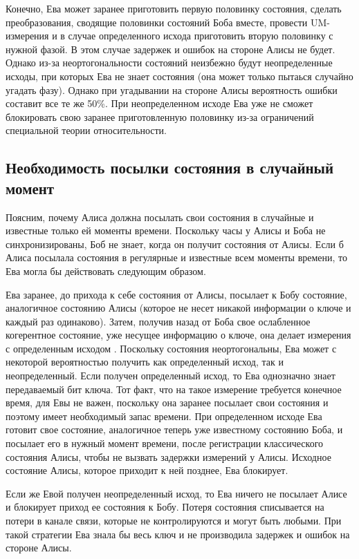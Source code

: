 Конечно, Ева может заранее приготовить первую половинку состояния, сделать преобразования, сводящие половинки состояний Боба вместе, провести UM-измерения и в случае определенного исхода приготовить вторую половинку с нужной фазой. В этом случае задержек и ошибок на стороне Алисы не будет. Однако из-за неортогональности состояний неизбежно будут неопределенные исходы, при которых Ева не знает состояния (она может только пытаься случайно угадать фазу). Однако при угадывании на стороне Алисы вероятность ошибки составит все те же 50\%. При неопределенном исходе Ева уже не сможет блокировать свою заранее приготовленную половинку из-за ограничений специальной теории относительности.

\subsection{Необходимость посылки состояния в случайный момент}
Поясним, почему Алиса должна посылать свои состояния в случайные и известные только ей моменты времени. Поскольку часы у Алисы и Боба не синхронизированы, Боб не знает, когда он получит состояния от Алисы. Если б Алиса посылала состояния в регулярные и известные всем моменты времени, то Ева могла бы действовать следующим образом.

Ева заранее, до прихода к себе состояния от Алисы, посылает к Бобу состояние, аналогичное состоянию Алисы (которое не несет никакой информации о ключе и каждый раз одинаково). 
Затем, получив назад от Боба свое ослабленное когерентное состояние, уже несущее информацию о ключе, она делает измерения с определенным исходом \cite{scarani2009secpraquakeydis}. 
Поскольку состояния неортогональны, Ева может с некоторой вероятностью получить как определенный исход, так и неопределенный. 
Если получен определенный исход, то Ева однозначно знает передаваемый бит ключа. 
Тот факт, что на такое измерение требуется конечное время, для Евы не важен, поскольку она заранее посылает свои состояния и поэтому имеет необходимый запас времени. 
При определенном исходе Ева готовит свое состояние, аналогичное теперь уже известному состоянию Боба, и посылает его в нужный момент времени, после регистрации классического состояния Алисы, чтобы не вызвать задержки измерений у Алисы. 
Исходное состояние Алисы, которое приходит к ней позднее, Ева блокирует.

Если же Евой получен неопределенный исход, то Ева ничего не посылает Алисе и блокирует приход ее состояния к Бобу. 
Потеря состояния списывается на потери в канале связи, которые не контролируются и могут быть любыми. 
При такой стратегии Ева знала бы весь ключ и не производила задержек и ошибок на стороне Алисы.

